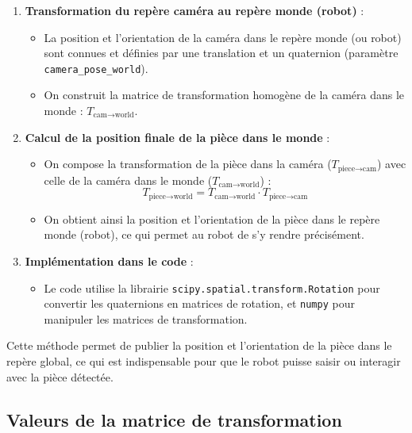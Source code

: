 \begin{enumerate}
\begin{itemize}
          \end{itemize}
    \item \textbf{Transformation du repère caméra au repère monde (robot)} :
          \begin{itemize}
              \item La position et l'orientation de la caméra dans le repère monde (ou robot) sont connues et définies par une translation et un quaternion (paramètre \texttt{camera\_pose\_world}).
              \item On construit la matrice de transformation homogène de la caméra dans le monde : $T_{\text{cam} \to \text{world}}$.
          \end{itemize}
    \item \textbf{Calcul de la position finale de la pièce dans le monde} :
          \begin{itemize}
              \item On compose la transformation de la pièce dans la caméra ($T_{\text{piece} \to \text{cam}}$) avec celle de la caméra dans le monde ($T_{\text{cam} \to \text{world}}$) :
                    \[
                        T_{\text{piece} \to \text{world}} = T_{\text{cam} \to \text{world}} \cdot T_{\text{piece} \to \text{cam}}
                    \]
              \item On obtient ainsi la position et l'orientation de la pièce dans le repère monde (robot), ce qui permet au robot de s'y rendre précisément.
          \end{itemize}
    \item \textbf{Implémentation dans le code} :
          \begin{itemize}
              \item Le code utilise la librairie \texttt{scipy.spatial.transform.Rotation} pour convertir les quaternions en matrices de rotation, et \texttt{numpy} pour manipuler les matrices de transformation.
          \end{itemize}
\end{enumerate}



Cette méthode permet de publier la position et l'orientation de la pièce dans le repère global, ce qui est indispensable pour que le robot puisse saisir ou interagir avec la pièce détectée.

\subsection{Valeurs de la matrice de transformation}

